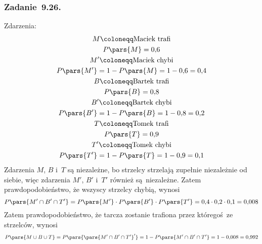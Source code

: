 \subsubsection*{Zadanie~9.26.}
Zdarzenia:
\begin{gather*}
    M \coloneqq \text{Maciek trafi}\\
    P\pars{M} = 0{,}6\\
    M' \coloneqq \text{Maciek chybi}\\
    P\pars{M'} = 1 - P\pars{M} = 1 - 0{,}6 = 0{,}4\\
    B \coloneqq \text{Bartek trafi}\\
    P\pars{B} = 0{,}8\\
    B' \coloneqq \text{Bartek chybi}\\
    P\pars{B'} = 1 - P\pars{B} = 1 - 0{,}8 = 0{,}2\\
    T \coloneqq \text{Tomek trafi}\\
    P\pars{T} = 0{,}9\\
    T' \coloneqq \text{Tomek chybi}\\
    P\pars{T'} = 1 - P\pars{T} = 1 - 0{,}9 = 0{,}1
\end{gather*}
Zdarzenia \(M\), \(B\) i~\(T\) są niezależne, bo strzelcy strzelają zupełnie niezależnie od siebie, więc zdarzenia \(M'\), \(B'\) i~\(T'\) również są niezależne. Zatem prawdopodobieństwo, że wszyscy strzelcy chybią, wynosi
\begin{equation*}
    P\pars{M' \cap B' \cap T'}
        = P\pars{M'} \cdot P\pars{B'} \cdot P\pars{T'}
        = 0{,}4 \cdot 0{,}2 \cdot 0{,}1
        = 0{,}008
\end{equation*}
Zatem prawdopodobieństwo, że tarcza zostanie trafiona przez któregoś ze strzelców, wynosi
\begin{equation*}
    P\pars{M \cup B \cup T}
        = P\pars{\pars{M' \cap B' \cap T'}'}
        = 1 - P\pars{M' \cap B' \cap T'}
        = 1 - 0{,}008
        = 0{,}992
\end{equation*}
